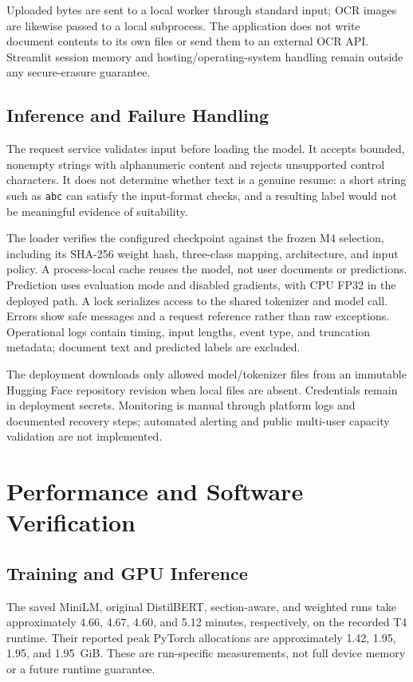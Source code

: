 \documentclass[conference,a4paper]{IEEEtran}
\begin{document}
Uploaded bytes are sent to a local worker through standard input; OCR images are likewise passed to a local subprocess. The application does not write document contents to its own files or send them to an external OCR API. Streamlit session memory and hosting/operating-system handling remain outside any secure-erasure guarantee.

\subsection{Inference and Failure Handling}
The request service validates input before loading the model. It accepts bounded, nonempty strings with alphanumeric content and rejects unsupported control characters. It does not determine whether text is a genuine resume: a short string such as \texttt{abc} can satisfy the input-format checks, and a resulting label would not be meaningful evidence of suitability.

The loader verifies the configured checkpoint against the frozen M4 selection, including its SHA-256 weight hash, three-class mapping, architecture, and input policy. A process-local cache reuses the model, not user documents or predictions. Prediction uses evaluation mode and disabled gradients, with CPU FP32 in the deployed path. A lock serializes access to the shared tokenizer and model call. Errors show safe messages and a request reference rather than raw exceptions. Operational logs contain timing, input lengths, event type, and truncation metadata; document text and predicted labels are excluded.

The deployment downloads only allowed model/tokenizer files from an immutable Hugging Face repository revision when local files are absent. Credentials remain in deployment secrets. Monitoring is manual through platform logs and documented recovery steps; automated alerting and public multi-user capacity validation are not implemented.

\section{Performance and Software Verification}
\subsection{Training and GPU Inference}
The saved MiniLM, original DistilBERT, section-aware, and weighted runs take approximately 4.66, 4.67, 4.60, and 5.12 minutes, respectively, on the recorded T4 runtime. Their reported peak PyTorch allocations are approximately 1.42, 1.95, 1.95, and 1.95~GiB. These are run-specific measurements, not full device memory or a future runtime guarantee.
\end{document}
